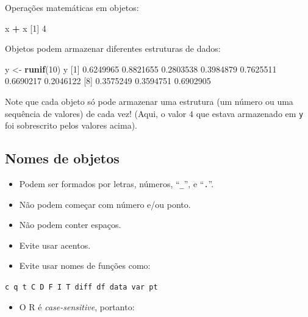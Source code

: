\documentclass[10pt,a4paper]{book}
\newenvironment{Shaded}{\begin{snugshade}}{\end{snugshade}}
\newcommand{\KeywordTok}[1]{\textcolor[rgb]{0.13,0.29,0.53}{\textbf{#1}}}
\newcommand{\DecValTok}[1]{\textcolor[rgb]{0.00,0.00,0.81}{#1}}
\newcommand{\FloatTok}[1]{\textcolor[rgb]{0.00,0.00,0.81}{#1}}
\newcommand{\StringTok}[1]{\textcolor[rgb]{0.31,0.60,0.02}{#1}}
\newcommand{\OperatorTok}[1]{\textcolor[rgb]{0.81,0.36,0.00}{\textbf{#1}}}
\newcommand{\NormalTok}[1]{#1}
\providecommand{\tightlist}{%
  \setlength{\itemsep}{0pt}\setlength{\parskip}{0pt}}
\begin{document}
Operações matemáticas em objetos:

\begin{Shaded}
\begin{Highlighting}[]
\NormalTok{x }\OperatorTok{+}\StringTok{ }\NormalTok{x}
\NormalTok{[}\DecValTok{1}\NormalTok{] }\DecValTok{4}
\end{Highlighting}
\end{Shaded}

Objetos podem armazenar diferentes estruturas de dados:

\begin{Shaded}
\begin{Highlighting}[]
\NormalTok{y <-}\StringTok{ }\KeywordTok{runif}\NormalTok{(}\DecValTok{10}\NormalTok{)}
\NormalTok{y}
\NormalTok{ [}\DecValTok{1}\NormalTok{] }\FloatTok{0.6249965} \FloatTok{0.8821655} \FloatTok{0.2803538} \FloatTok{0.3984879} \FloatTok{0.7625511} \FloatTok{0.6690217} \FloatTok{0.2046122}
\NormalTok{ [}\DecValTok{8}\NormalTok{] }\FloatTok{0.3575249} \FloatTok{0.3594751} \FloatTok{0.6902905}
\end{Highlighting}
\end{Shaded}

Note que cada objeto só pode armazenar uma estrutura (um número ou uma
sequência de valores) de cada vez! (Aqui, o valor \(4\) que estava
armazenado em \texttt{y} foi sobrescrito pelos valores acima).

\subsection{Nomes de objetos}\label{nomes-de-objetos}

\begin{itemize}
\tightlist
\item
  Podem ser formados por letras, números, ``\texttt{\_}'', e
  ``\texttt{.}''.
\item
  Não podem começar com número e/ou ponto.
\item
  Não podem conter espaços.
\item
  Evite usar acentos.
\item
  Evite usar nomes de funções como:
\end{itemize}

\texttt{c\ q\ t\ C\ D\ F\ I\ T\ diff\ df\ data\ var\ pt}

\begin{itemize}
\tightlist
\item
  O R é \emph{case-sensitive}, portanto:
\end{itemize}
\end{document}
